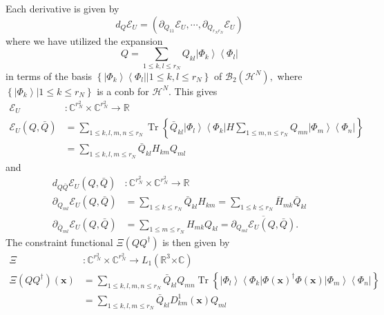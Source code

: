 \documentclass[aps,preprint]{revtex4}%
\begin{document}
Each derivative is given by
\begin{equation}
d_{Q}\mathcal{E}_{U}=\left(  \partial_{Q_{11}}\mathcal{E}_{U},\cdots
,\partial_{Q_{r_{N}r_{N}}}\mathcal{E}_{U}\right)
\end{equation}
where we have utilized the expansion
\begin{equation}
Q=\sum_{1\leq k,l\leq r_{N}}Q_{kl}\left\vert \Phi_{k}\right\rangle
\left\langle \Phi_{l}\right\vert
\end{equation}
in terms of the basis $\left\{  \left.  \left\vert \Phi_{k}\right\rangle
\left\langle \Phi_{l}\right\vert \right\vert 1\leq k,l\leq r_{N}\right\}  $ of
$\mathcal{B}_{2}\left(  \mathcal{H}^{N}\right)  ,$ where $\left\{  \left.
\left\vert \Phi_{k}\right\rangle \right\vert 1\leq k\leq r_{N}\right\}  $ is a
conb for $\mathcal{H}^{N}.$ This gives
\begin{align}
\mathcal{E}_{U}  &  :\mathbb{C}^{r_{N}^{2}}\times\mathbb{C}^{r_{N}^{2}%
}\rightarrow\mathbb{R}\nonumber\\
\mathcal{E}_{U}\left(  Q,\bar{Q}\right)   &  =\sum_{1\leq k,l,m,n\leq r_{N}%
}\operatorname{Tr}\left\{  \bar{Q}_{kl}\left\vert \Phi_{l}\right\rangle
\left\langle \Phi_{k}\right\vert H\sum_{1\leq m,n\leq r_{N}}Q_{mn}\left\vert
\Phi_{m}\right\rangle \left\langle \Phi_{n}\right\vert \right\} \nonumber\\
&  =\sum_{1\leq k,l,m\leq r_{N}}\bar{Q}_{kl}H_{km}Q_{ml}%
\end{align}
and
\begin{align}
d_{Q\bar{Q}}\mathcal{E}_{U}\left(  Q,\bar{Q}\right)   &  :\mathbb{C}%
^{r_{N}^{2}}\times\mathbb{C}^{r_{N}^{2}}\rightarrow\mathbb{R}\nonumber\\
\partial_{Q_{ml}}\mathcal{E}_{U}\left(  Q,\bar{Q}\right)   &  =\sum_{1\leq
k\leq r_{N}}\bar{Q}_{kl}H_{km}=\sum_{1\leq k\leq r_{N}}\bar{H}_{mk}\bar
{Q}_{kl}\nonumber\\
\partial_{\bar{Q}_{ml}}\mathcal{E}_{U}\left(  Q,\bar{Q}\right)   &
=\sum_{1\leq m\leq r_{N}}H_{mk}Q_{kl}=\overline{\partial_{Q_{ml}}%
\mathcal{E}_{U}\left(  Q,\bar{Q}\right)  }.
\end{align}
The constraint functional $\Xi\left(  QQ^{\dagger}\right)  $ is then given by
\begin{align}
\Xi &  :\mathbb{C}^{r_{N}^{2}}\times\mathbb{C}^{r_{N}^{2}}\rightarrow
L_{1}\left(  \mathbb{R}^{3}\mathbb{\times C}\right) \nonumber\\
\Xi\left(  QQ^{\dagger}\right)  \left(  \mathbf{x}\right)   &  =\sum_{1\leq
k,l,m,n\leq r_{N}}\bar{Q}_{kl}Q_{mn}\operatorname{Tr}\left\{  \left\vert
\Phi_{l}\right\rangle \left\langle \Phi_{k}\right\vert \Phi\left(
\mathbf{x}\right)  ^{\dagger}\Phi\left(  \mathbf{x}\right)  \left\vert
\Phi_{m}\right\rangle \left\langle \Phi_{n}\right\vert \right\} \nonumber\\
&  =\sum_{1\leq k,l,m\leq r_{N}}\bar{Q}_{kl}D_{km}^{1}\left(  \mathbf{x}%
\right)  Q_{ml}%
\end{align}
\end{document}
